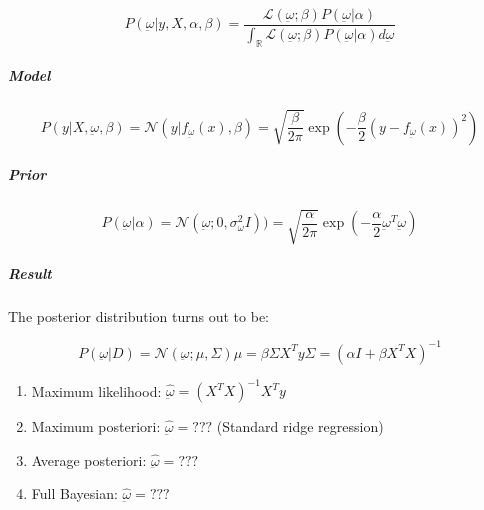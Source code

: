 \[P(\underbar{\omega} | y, X, \alpha, \beta) = \frac{\mathcal{L}(\underbar{\omega}; \beta) P(\underbar{\omega} | \alpha)}
	{\int_{\mathds{R}} \mathcal{L}(\underbar{\omega}; \beta) P(\underbar{\omega} | \alpha) d\underbar{\omega}}
\]

\begin{recap}{}{}

\subparagraph{Model}

\[
	P(y |  X, \underbar{\omega}, \beta) = \mathcal{N}(y | f_{\underbar{\omega}}(x), \beta) =
	\sqrt{\frac{\beta}{2\pi}} \exp \left( -\frac{\beta}{2} (y - f_{\underbar{\omega}}(x))^2 \right)
\]

\subparagraph{Prior}

\[P(\underbar{\omega} | \alpha) = \mathcal{N}(\underbar{\omega} ; 0 , \sigma_{\omega}^2 I)) =
	\sqrt{\frac{\alpha}{2\pi}} \exp \left( -\frac{\alpha}{2} \underbar{\omega}^T \underbar{\omega} \right)
\]

\subparagraph{Result}

The posterior distribution turns out to be:

\[P(\underbar{\omega} | D) = \mathcal{N}(\underbar{\omega} ; \mu, \Sigma)
	\mu = \beta \Sigma X^T y
	\Sigma = \left( \alpha I + \beta X^T X \right)^{-1}
\]

\begin{enumerate}
	\item
	      Maximum likelihood: \(\hat{\underbar{\omega}} = (X^T X)^{-1} X^T y\)
	\item
	      Maximum posteriori: \(\hat{\underbar{\omega}} = ???\) (Standard ridge
	      regression)
	\item
	      Average posteriori: \(\hat{\underbar{\omega}} = ???\)
	\item
	      Full Bayesian: \(\hat{\underbar{\omega}} = ???\)
\end{enumerate}

\end{recap}
